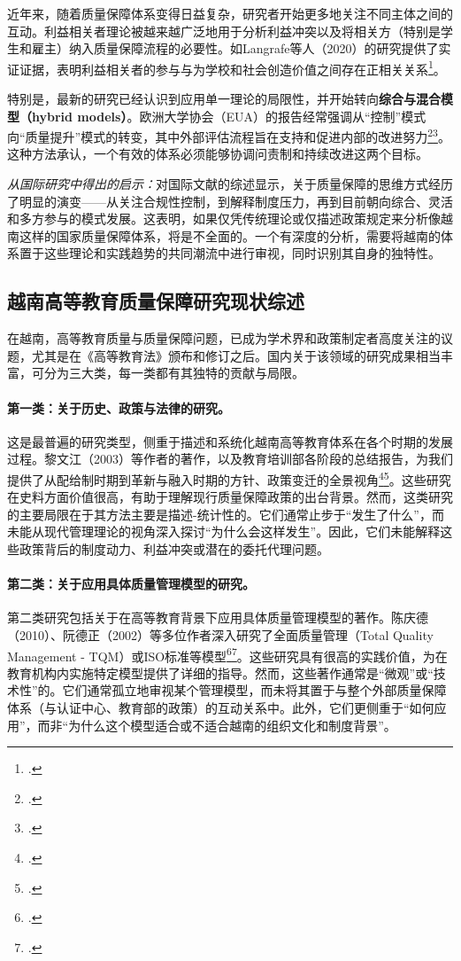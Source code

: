 近年来，随着质量保障体系变得日益复杂，研究者开始更多地关注不同主体之间的互动。利益相关者理论被越来越广泛地用于分析利益冲突以及将相关方（特别是学生和雇主）纳入质量保障流程的必要性。如Langrafe等人（2020）的研究提供了实证证据，表明利益相关者的参与与为学校和社会创造价值之间存在正相关关系\footcite{Langrafe2020}。

特别是，最新的研究已经认识到应用单一理论的局限性，并开始转向\textbf{综合与混合模型（hybrid models）}。欧洲大学协会（EUA）的报告经常强调从“控制”模式向“质量提升”模式的转变，其中外部评估流程旨在支持和促进内部的改进努力\footcite{EUA_Integration}\footcite{HarveyStensaker}。这种方法承认，一个有效的体系必须能够协调问责制和持续改进这两个目标。

\textit{从国际研究中得出的启示：}对国际文献的综述显示，关于质量保障的思维方式经历了明显的演变——从关注合规性控制，到解释制度压力，再到目前朝向综合、灵活和多方参与的模式发展。这表明，如果仅凭传统理论或仅描述政策规定来分析像越南这样的国家质量保障体系，将是不全面的。一个有深度的分析，需要将越南的体系置于这些理论和实践趋势的共同潮流中进行审视，同时识别其自身的独特性。





\subsection{越南高等教育质量保障研究现状综述}
\label{subsec:tong_quan_vietnam}

在越南，高等教育质量与质量保障问题，已成为学术界和政策制定者高度关注的议题，尤其是在《高等教育法》颁布和修订之后。国内关于该领域的研究成果相当丰富，可分为三大类，每一类都有其独特的贡献与局限。

\paragraph{第一类：关于历史、政策与法律的研究。}
这是最普遍的研究类型，侧重于描述和系统化越南高等教育体系在各个时期的发展过程。黎文江（2003）等作者的著作，以及教育培训部各阶段的总结报告，为我们提供了从配给制时期到革新与融入时期的方针、政策变迁的全景视角\footcite{LeVanGiang2003}\footcite{MOET_50nam}。这些研究在史料方面价值很高，有助于理解现行质量保障政策的出台背景。然而，这类研究的主要局限在于其方法主要是描述-统计性的。它们通常止步于“发生了什么”，而未能从现代管理理论的视角深入探讨“为什么会这样发生”。因此，它们未能解释这些政策背后的制度动力、利益冲突或潜在的委托代理问题。

\paragraph{第二类：关于应用具体质量管理模型的研究。}
第二类研究包括关于在高等教育背景下应用具体质量管理模型的著作。陈庆德（2010）、阮德正（2002）等多位作者深入研究了全面质量管理（Total Quality Management - TQM）或ISO标准等模型\footcite{TranKhanhDuc2010}\footcite{NguyenDucChinh2002}。这些研究具有很高的实践价值，为在教育机构内实施特定模型提供了详细的指导。然而，这些著作通常是“微观”或“技术性”的。它们通常孤立地审视某个管理模型，而未将其置于与整个外部质量保障体系（与认证中心、教育部的政策）的互动关系中。此外，它们更侧重于“如何应用”，而非“为什么这个模型适合或不适合越南的组织文化和制度背景”。

